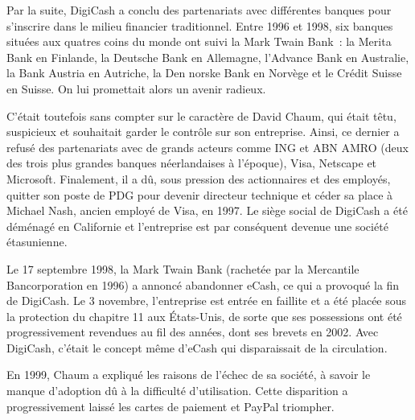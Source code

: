 Par la suite, DigiCash a conclu des partenariats avec différentes banques pour s'inscrire dans le milieu financier traditionnel. Entre 1996 et 1998, six banques situées aux quatres coins du monde ont suivi la Mark Twain Bank~: la Merita Bank en Finlande, la Deutsche Bank en Allemagne, l'Advance Bank en Australie, la Bank Austria en Autriche, la Den norske Bank en Norvège et le Crédit Suisse en Suisse. On lui promettait alors un avenir radieux.

C'était toutefois sans compter sur le caractère de David Chaum, qui était têtu, suspicieux et souhaitait garder le contrôle sur son entreprise. Ainsi, ce dernier a refusé des partenariats avec de grands acteurs comme ING et ABN AMRO (deux des trois plus grandes banques néerlandaises à l'époque), Visa, Netscape et Microsoft. Finalement, il a dû, sous pression des actionnaires et des employés, quitter son poste de PDG pour devenir directeur technique et céder sa place à Michael Nash, ancien employé de Visa, en 1997. Le siège social de DigiCash a été déménagé en Californie et l'entreprise est par conséquent devenue une société étasunienne.

Le 17 septembre 1998, la Mark Twain Bank (rachetée par la Mercantile Bancorporation en 1996) a annoncé abandonner eCash, ce qui a provoqué la fin de DigiCash. Le 3 novembre, l'entreprise est entrée en faillite et a été placée sous la protection du chapitre 11 aux États-Unis, de sorte que ses possessions ont été progressivement revendues au fil des années, dont ses brevets en 2002. Avec DigiCash, c'était le concept même d'eCash qui disparaissait de la circulation.

En 1999, Chaum a expliqué les raisons de l'échec de sa société, à savoir le manque d'adoption dû à la difficulté d'utilisation. Cette disparition a progressivement laissé les cartes de paiement et PayPal triompher. %

